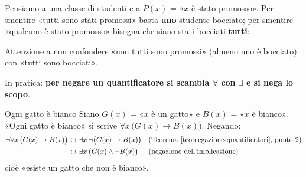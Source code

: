 \begin{spiegazione}
    Pensiamo a una classe di studenti e a $P(x)$ = «$x$ è stato promosso». Per smentire «tutti sono stati promossi» basta \textbf{uno} studente bocciato;
    per smentire «qualcuno è stato promosso» bisogna che siano stati bocciati \textbf{tutti}:
    \begin{center}
    \end{center}
    Attenzione a non confondere «non tutti sono promossi» (almeno uno è bocciato) con «tutti sono bocciati».
\end{spiegazione}


In pratica: \textbf{per negare un quantificatore si scambia $\forall$ con $\exists$ e si nega lo scopo}.

\begin{esempio}{Ogni gatto è bianco}
    Siano $G(x)$ = «$x$ è un gatto» e $B(x)$ = «$x$ è bianco». «Ogni gatto è bianco» si scrive
    $\forall x\,\big(G(x) \rightarrow B(x)\big)$. Negando:
    \[
    \begin{aligned}
        \neg\forall x\,\big(G(x) \rightarrow B(x)\big)
        &\leftrightarrow \exists x\,\neg\big(G(x) \rightarrow B(x)\big) && \text{(Teorema~\ref{teo:negazione-quantificatori}, punto 2)}\\
        &\leftrightarrow \exists x\,\big(G(x) \wedge \neg B(x)\big) && \text{(negazione dell'implicazione)}
    \end{aligned}
    \]
    cioè «esiste un gatto che non è bianco».
\end{esempio}

